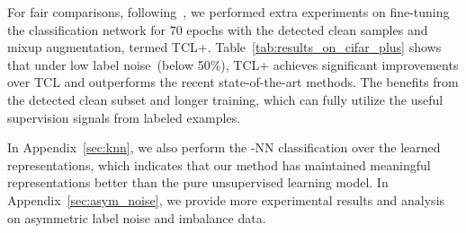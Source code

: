 For fair comparisons, following~\cite{ortego2021multi,li2022selective}, we performed extra experiments on fine-tuning the classification network for 70 epochs with the detected clean samples and mixup augmentation, termed TCL+. Table~\ref{tab:results_on_cifar_plus} shows that under low label noise~(below 50\%), TCL+ achieves significant improvements over TCL and outperforms the recent state-of-the-art methods. The benefits from the detected clean subset and longer training, which can fully utilize the useful supervision signals from labeled examples.


In Appendix~\ref{sec:knn}, we also perform the -NN classification over the learned representations, which indicates that our method has maintained meaningful representations better than the pure unsupervised learning model.
In Appendix~\ref{sec:asym_noise}, we provide more experimental results and analysis on asymmetric label noise and imbalance data.


\begin{table}[t]
   \centering
   \caption{
      Comparisons with SOTAs under \emph{low} label noise.
   }
   \label{tab:results_on_cifar_plus}
\end{table}

